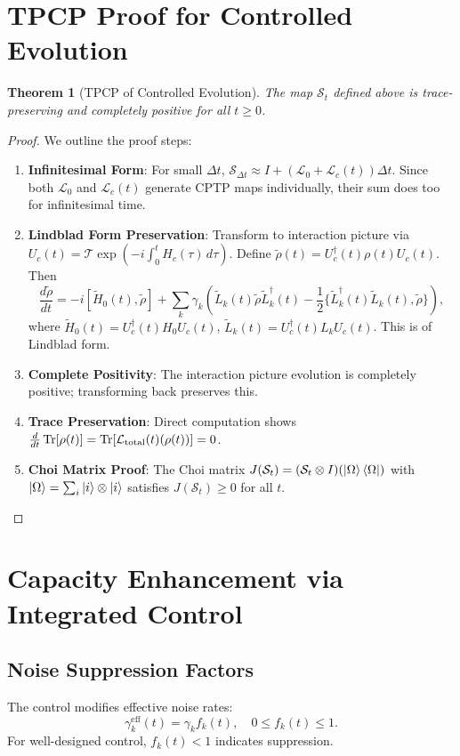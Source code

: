 \documentclass[12pt]{article}
\newtheorem{theorem}{Theorem}[section]
\newcommand{\SJ}{\mathcal{S}}
\newcommand{\Lgen}{\mathcal{L}}
\newcommand{\T}{\mathcal{T}}
\begin{document}
\section{TPCP Proof for Controlled Evolution}
\begin{theorem}[TPCP of Controlled Evolution]
    The map $\SJ_t$ defined above is trace-preserving and completely positive for all $t \geq 0$.
\end{theorem}
\begin{proof}
    We outline the proof steps:
    \begin{enumerate}
        \item \textbf{Infinitesimal Form}: For small $\Delta t$, $\SJ_{\Delta t} \approx I + (\Lgen_0 + \Lgen_c(t))\Delta t$. Since both $\Lgen_0$ and $\Lgen_c(t)$ generate CPTP maps individually, their sum does too for infinitesimal time.
        \item \textbf{Lindblad Form Preservation}: Transform to interaction picture via $U_c(t) = \T \exp(-i\int_0^t H_c(\tau) \, d\tau)$. Define $\tilde{\rho}(t) = U_c^\dagger(t) \rho(t) U_c(t)$. Then
        \begin{equation}
            \frac{d\tilde{\rho}}{dt} = -i[\tilde{H}_0(t), \tilde{\rho}] + \sum_k \gamma_k \left( \tilde{L}_k(t) \tilde{\rho} \tilde{L}_k^\dagger(t) - \frac{1}{2} \{ \tilde{L}_k^\dagger(t) \tilde{L}_k(t), \tilde{\rho} \} \right),
        \end{equation}
        where $\tilde{H}_0(t) = U_c^\dagger(t) H_0 U_c(t)$, $\tilde{L}_k(t) = U_c^\dagger(t) L_k U_c(t)$. This is of Lindblad form.
        \item \textbf{Complete Positivity}: The interaction picture evolution is completely positive; transforming back preserves this.
        \item \textbf{Trace Preservation}: Direct computation shows $\frac{d}{dt} \Tr[\rho(t)] = \Tr[\Lgen_{\text{total}}(t)(\rho(t))] = 0$.
        \item \textbf{Choi Matrix Proof}: The Choi matrix $J(\SJ_t) = (\SJ_t \otimes I)(\ket{\Omega}\bra{\Omega})$ with $\ket{\Omega} = \sum_i \ket{i}\otimes\ket{i}$ satisfies $J(\SJ_t) \geq 0$ for all $t$.
    \end{enumerate}
\end{proof}

\section{Capacity Enhancement via Integrated Control}
\subsection{Noise Suppression Factors}
The control modifies effective noise rates:
\begin{equation}
    \gamma_k^{\text{eff}}(t) = \gamma_k f_k(t), \quad 0 \leq f_k(t) \leq 1.
\end{equation}
For well-designed control, $f_k(t) < 1$ indicates suppression.
\end{document}
